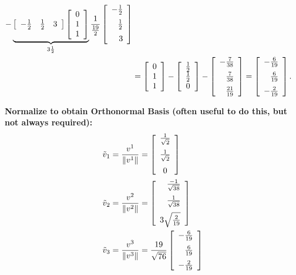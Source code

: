 \documentclass[11pt,twoside]{nsf_jwg}
\begin{document}
\begin{align*}
		- \underbrace{%
		   \left[ \begin{array}{ccc}
			-\frac{1}{2} & \frac{1}{2} & 3 \end{array} \right]
		   \left[ \begin{array}{c} 0 \\ 1 \\ 1 \end{array} \right]%
		   }_{3\frac{1}{2}}
		\frac{1}{\frac{19}{2}}
		   \left[ \begin{array}{r}
			-\frac{1}{2} \medskip \\ \frac{1}{2} \medskip \\ 3 \end{array} \right] \\
		&= \left[ \begin{array}{c} 0 \\ 1 \\ 1 \end{array} \right]
		- \left[ \begin{array}{c}
			\frac{1}{2} \\ \frac{1}{2} \\ 0 \end{array} \right]
		- \left[ \begin{array}{r}
			-\frac{7}{38} \medskip \\ \frac{7}{38} \medskip \\ \frac{21}{19}
			\end{array} \right]
		= \left[ \begin{array}{r}
			-\frac{6}{19} \medskip \\ \frac{6}{19} \medskip \\ -\frac{2}{19}
			\end{array} \right].
	\end{align*}

\noindent\textbf{Normalize to obtain Orthonormal Basis (often useful to do this, but not always required):}\\
	\begin{align*}
		\tilde{v}_1 &= \frac{v^1}{\| v^1 \|} = \left[ \begin{array}{c} \frac{1}{\sqrt{2}} \medskip \\ \frac{1}{\sqrt{2}} \medskip \\ 0 \end{array} \right]\\
		\tilde{v}_2 &= \frac{v^2}{\| v^2 \|} = \left[ \begin{array}{r} \frac{-1}{\sqrt{38}} \medskip \\ \frac{1}{\sqrt{38}} \medskip \\ 3\sqrt{\frac{2}{19}} \end{array} \right]\\
		\tilde{v}_3 &= \frac{v^3}{\| v^3 \|} = \frac{19}{\sqrt{76}} \left[ \begin{array}{r} -\frac{6}{19} \medskip \\ \frac{6}{19} \medskip \\ -\frac{2}{19}
			\end{array} \right]\\
	\end{align*}
	
\end{document}
